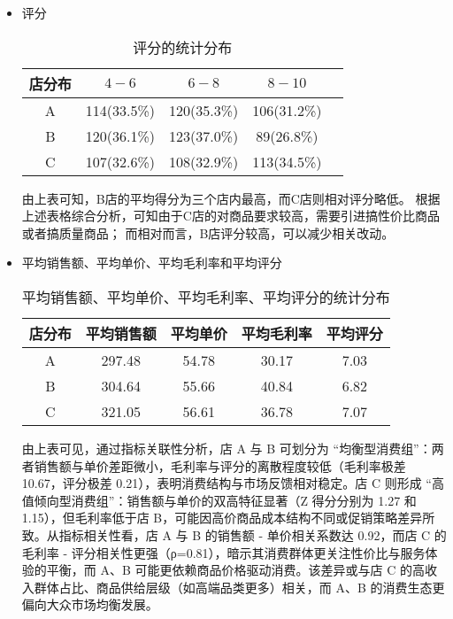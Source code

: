 \documentclass[withoutpreface,bwprint]{cumcmthesis}
\begin{document}
\begin{itemize}[itemindent=2em]
\item 评分
\begin{table}[H]
    \caption{评分的统计分布}%
    \centering
    \fontsize{12}{14}\selectfont   
    \begin{tabular}{ccccc}
        \toprule[1.5pt]
        店分布 & $4-6$ & $6-8$ & $8-10$ \\
        \midrule[1pt]
        A & 114(33.5\%) &120(35.3\%) & 106(31.2\%) \\
        B & 120(36.1\%) & 123(37.0\%) & 89(26.8\%) \\
        C & 107(32.6\%) & 108(32.9\%) & 113(34.5\%) \\
        \bottomrule[1.5pt]
    \end{tabular}
\end{table}
\par
由上表可知，B店的平均得分为三个店内最高，而C店则相对评分略低。
根据上述表格综合分析，可知由于C店的对商品要求较高，需要引进搞性价比商品或者搞质量商品；
而相对而言，B店评分较高，可以减少相关改动。



\item 平均销售额、平均单价、平均毛利率和平均评分
\begin{table}[H]
    \caption{平均销售额、平均单价、平均毛利率、平均评分的统计分布}%
    \centering
    \fontsize{12}{14}\selectfont   
    \begin{tabular}{ccccc}
        \toprule[1.5pt]
        店分布 & 平均销售额 & 平均单价 & 平均毛利率 & 平均评分 \\
        \midrule[1pt]
        A & 297.48 & 54.78 & 30.17 & 7.03 \\
        B &  304.64& 55.66 & 40.84 & 6.82 \\
        C & 321.05 & 56.61 & 36.78 & 7.07 \\
        \bottomrule[1.5pt]
    \end{tabular}
\end{table}
由上表可见，通过指标关联性分析，店 A 与 B 可划分为 “均衡型消费组”：两者销售额与单价差距微小，毛利率与评分的离散程度较低（毛利率极差 10.67，评分极差 0.21），表明消费结构与市场反馈相对稳定。店 C 则形成 “高值倾向型消费组”：销售额与单价的双高特征显著（Z 得分分别为 1.27 和 1.15），但毛利率低于店 B，可能因高价商品成本结构不同或促销策略差异所致。从指标相关性看，店 A 与 B 的销售额 - 单价相关系数达 0.92，而店 C 的毛利率 - 评分相关性更强（ρ=0.81），暗示其消费群体更关注性价比与服务体验的平衡，而 A、B 可能更依赖商品价格驱动消费。该差异或与店 C 的高收入群体占比、商品供给层级（如高端品类更多）相关，而 A、B 的消费生态更偏向大众市场均衡发展。


\end{itemize}
\end{document}
